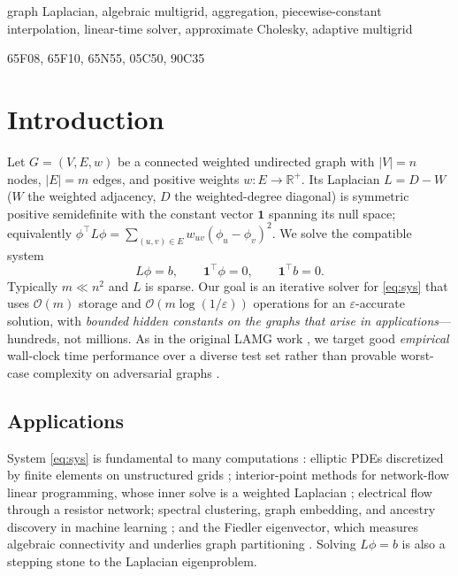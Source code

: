 \documentclass[leqno,letterpaper]{etna}
\newcommand{\Om}{\mathcal{O}(m)}
\newcommand{\R}{\mathbb{R}}
\begin{document}
\begin{keywords}
graph Laplacian, algebraic multigrid, aggregation, piecewise-constant interpolation,
linear-time solver, approximate Cholesky, adaptive multigrid
\end{keywords}

\begin{AMS}
65F08, 65F10, 65N55, 05C50, 90C35
\end{AMS}

\section{Introduction}\label{sec:intro}
Let $G=(V,E,w)$ be a connected weighted undirected graph with $|V|=n$ nodes, $|E|=m$
edges, and positive weights $w:E\to\R^+$. Its Laplacian $L=D-W$ ($W$ the weighted
adjacency, $D$ the weighted-degree diagonal) is symmetric positive semidefinite with the
constant vector $\mathbf 1$ spanning its null space; equivalently
$\phi^{\top}L\phi=\sum_{(u,v)\in E}w_{uv}(\phi_u-\phi_v)^2$. We solve the compatible
system
\begin{equation}\label{eq:sys}
L\phi=b,\qquad \mathbf 1^{\top}\phi=0,\qquad \mathbf 1^{\top}b=0 .
\end{equation}
Typically $m\ll n^2$ and $L$ is sparse. Our goal is an iterative solver for
\eqref{eq:sys} that uses $\Om$ storage and $\mathcal{O}(m\log(1/\varepsilon))$ operations
for an $\varepsilon$-accurate solution, with \emph{bounded hidden constants on the graphs
that arise in applications}---hundreds, not millions. As in the original LAMG work
\cite{lamg}, we target good \emph{empirical} wall-clock time performance over a diverse test set rather
than provable worst-case complexity on adversarial graphs \cite{spielman-review}.

\subsection{Applications}\label{sec:apps}
System \eqref{eq:sys} is fundamental to many computations \cite[\S2]{spielman-review}:
elliptic PDEs discretized by finite elements on unstructured grids \cite{boman-fem};
interior-point methods for network-flow linear programming, whose inner solve is a
weighted Laplacian \cite{daitch-spielman}; electrical flow through a resistor network;
spectral clustering, graph embedding, and ancestry discovery in machine learning
\cite{ng-jordan-weiss}; and the Fiedler eigenvector, which measures algebraic
connectivity and underlies graph partitioning \cite{fiedler}. Solving $L\phi=b$ is also a stepping stone to the Laplacian eigenproblem.
\end{document}
